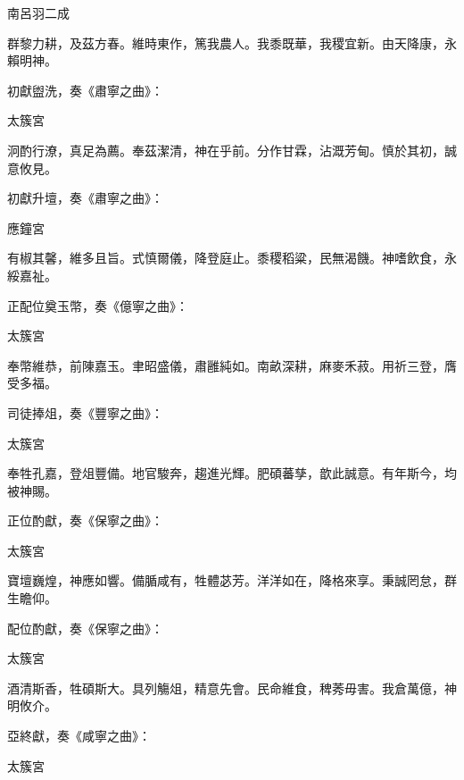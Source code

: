 \begin{pinyinscope}
 南呂羽二成



 群黎力耕，及茲方春。維時東作，篤我農人。我黍既華，我稷宜新。由天降康，永賴明神。



 初獻盥洗，奏《肅寧之曲》：



 太簇宮



 泂酌行潦，真足為薦。奉茲潔清，神在乎前。分作甘霖，沾溉芳甸。慎於其初，誠意攸見。



 初獻升壇，奏《肅寧之曲》：



 應鐘宮



 有椒其馨，維多且旨。式慎爾儀，降登庭止。黍稷稻粱，民無渴饑。神嗜飲食，永綏嘉祉。



 正配位奠玉幣，奏《億寧之曲》：



 太簇宮



 奉幣維恭，前陳嘉玉。聿昭盛儀，肅雝純如。南畝深耕，麻麥禾菽。用祈三登，膺受多福。



 司徒捧俎，奏《豐寧之曲》：



 太簇宮



 奉牲孔嘉，登俎豐備。地官駿奔，趨進光輝。肥碩蕃孳，歆此誠意。有年斯今，均被神賜。



 正位酌獻，奏《保寧之曲》：



 太簇宮



 寶壇巍煌，神應如響。備腯咸有，牲體苾芳。洋洋如在，降格來享。秉誠罔怠，群生瞻仰。



 配位酌獻，奏《保寧之曲》：



 太簇宮



 酒清斯香，牲碩斯大。具列觴俎，精意先會。民命維食，稗莠毋害。我倉萬億，神明攸介。



 亞終獻，奏《咸寧之曲》：



 太簇宮




\end{pinyinscope}
